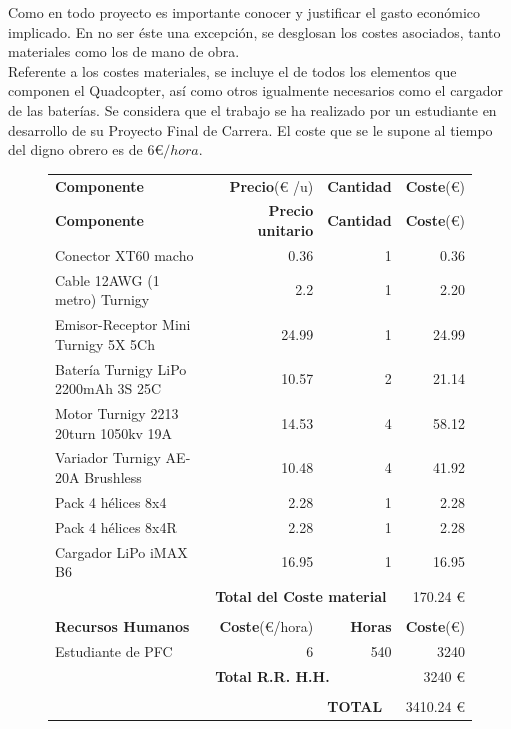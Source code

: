 \documentclass[twoside,11pt]{book}
\begin{document}
Como en todo proyecto es importante conocer y justificar el gasto económico implicado. En no ser éste una excepción, se desglosan los costes asociados, tanto materiales como los de mano de obra. \\
Referente a los costes materiales, se incluye el de todos los elementos que componen el Quadcopter, así como otros igualmente necesarios como el cargador de las baterías. Se considera que el trabajo se ha realizado por un estudiante en desarrollo de su Proyecto Final de Carrera. El coste que se le supone al tiempo del digno obrero es de $6$€$/ hora$. \\  
\begin{figure}[h!]
\hspace{-0.2cm}
\begin{tabular}{|l|r|r|r|}
\hline

\hspace{2cm}\textbf{Componente} & \textbf{Precio}(€ /u) & \textbf{Cantidad} & \textbf{Coste}(€) \\
\textbf{Componente} & \textbf{Precio unitario} & \textbf{Cantidad} & \textbf{Coste}(€) \\

\hline
\hline
Conector XT60 macho & 0.36 & 1 & 0.36 \\
Cable 12AWG (1 metro) Turnigy & 2.2 & 1 & 2.20 \\
Emisor-Receptor Mini Turnigy 5X 5Ch & 24.99 & 1 & 24.99 \\
Batería Turnigy LiPo 2200mAh 3S 25C & 10.57 & 2 & 21.14 \\
Motor Turnigy 2213 20turn 1050kv 19A & 14.53 & 4 & 58.12 \\
Variador Turnigy AE-20A Brushless & 10.48 & 4 & 41.92 \\
Pack 4 hélices 8x4 & 2.28 & 1 & 2.28 \\
Pack 4 hélices 8x4R & 2.28 & 1 & 2.28 \\ 

Cargador LiPo iMAX B6 & 16.95 & 1 & 16.95 \\
\hline \cmidrule{2-4}


\multicolumn{1}{r}{} & \multicolumn{2}{|l|}{\textbf{Total del Coste material}} & 170.24 €\\ \cmidrule{2-4}
\multicolumn{4}{r}{} \\
\hline
\hspace{1.5cm}\textbf{Recursos Humanos} & \textbf{Coste}(€/hora) & \textbf{Horas} & \textbf{Coste}(€) \\
\hline
\hline
Estudiante de PFC & 6 & 540 & 3240 \\
\hline \cmidrule{2-4}
\multicolumn{1}{r}{} & \multicolumn{2}{|l|}{\textbf{Total R.R. H.H.}} & 3240 €\\ \cmidrule{2-4}
\multicolumn{4}{r}{} \\
\cmidrule{3-4}
\multicolumn{2}{r}{} & \multicolumn{1}{|l|}{\textbf{TOTAL}} & 3410.24 €\\ \cmidrule{3-4}
\end{tabular} 
\end{figure}
\newpage
\end{document}
